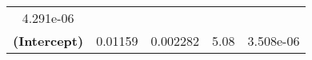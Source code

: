 \documentclass[]{book}
\theoremstyle{definition}
\theoremstyle{definition}
\theoremstyle{remark}
\begin{document}
\begin{longtable}[c]{@{}ccccc@{}}
\begin{minipage}[t]{0.11\columnwidth}
4.291e-06
\strut\end{minipage}\tabularnewline
\begin{minipage}[t]{0.38\columnwidth}\centering\strut
\textbf{(Intercept)}
\strut\end{minipage} &
\begin{minipage}[t]{0.12\columnwidth}\centering\strut
0.01159
\strut\end{minipage} &
\begin{minipage}[t]{0.14\columnwidth}\centering\strut
0.002282
\strut\end{minipage} &
\begin{minipage}[t]{0.11\columnwidth}\centering\strut
5.08
\strut\end{minipage} &
\begin{minipage}[t]{0.11\columnwidth}\centering\strut
3.508e-06
\strut\end{minipage}\tabularnewline
\bottomrule
\end{longtable}
\end{document}
